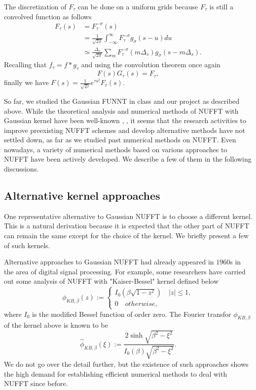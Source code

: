 The discretization of $F_{\tau}$ can be done on a uniform grids because $F_{\tau}$ is still a convolved function as follows
\begin{align}
     F_{\tau}(s)
  &= F_{\tau}^{-\sigma}(s) \\
  &= \frac{1}{\sqrt{2\pi}}\int_{-\infty}^{\infty}F_{\tau}^{-\sigma}g_{\sigma}(s-u)du \\
  &\simeq \frac{\Delta_{s}}{\sqrt{2\pi}}\sum_{m}^{}F_{\tau}^{-\sigma}(m\Delta_{s})
          g_{\sigma}(s - m\Delta_{s}).
\end{align}
Recalling that $f_{\tau} = f\ast g_{\tau}$ and using the convolution theorem once again
\begin{equation}
  F(s)G_{\tau}(s) = F_{\tau},
\end{equation}
finally we have $F(s) = \frac{1}{\sqrt{2\tau}}e^{\tau s^2}F_{\tau}(s)$.

So far, we studied the Gaussian FUNNT in class and our project as described above.
While the theoretical analysis and numerical methods of NUFFT with Gaussian kernel have been well-known \cite{SISC-1993-Dutt-Rokhlin}, \cite{SIAM-Rev-2004-Greengard}, it seems that the research activities to improve preexisting NUFFT schemes and develop alternative methods have not settled down, as far as we studied past numerical methods on NUFFT.
Even nowadays, a variety of numerical methods based on various approaches to NUFFT have been actively developed.
We describe a few of them in the following discussions.

\subsection{Alternative kernel approaches}
One representative alternative to Gaussian NUFFT is to choose a different kernel.
This is a natural derivation because it is expected that the other part of NUFFT can remain the same except for the choice of the kernel.
We briefly present a few of such kernels.

Alternative approaches to Gaussian NUFFT had already appeared in $1960$s in the area of digital signal processing.
For example, some researchers have carried out some analysis of NUFFT with "Kaiser-Bessel" kernel \cite{Book-Kaiser} defined below
\begin{equation}
  \phi_{KB,\beta}(z) :=
  \begin{cases}
    I_{0}\left(\beta\sqrt{1-z^2}\right) \quad |z| \le 1,\\
    0 \quad otherwise,
  \end{cases}
  \label{eq:KB-kernel}
\end{equation}
where $I_{0}$ is the modified Bessel function of order zero.
The Fourier transfor $\phi_{KB,\beta}$ of the kernel above is known to be
\begin{equation}
  \hat{\phi}_{KB,\beta}(\xi) :=
  \frac{2\sinh\sqrt{\beta^2-\xi^2}}{I_{0}(\beta)\sqrt{\beta^2-\xi^2}}.
  \label{eq:FT-KB-kernel}
\end{equation}
We do not go over the detail further, but the existence of such approaches shows the high demand for establishing efficient numerical methods to deal with NUFFT since before.

